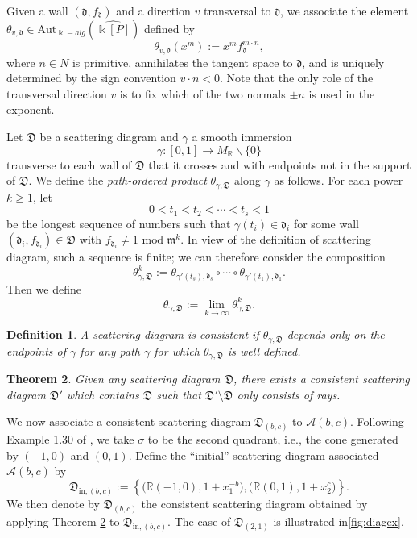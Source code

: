 \documentclass[11pt]{amsart}
\newtheorem{theorem}{Theorem}[section]
\newtheorem{defn}[theorem]{Definition}
\theoremstyle{remark}
\numberwithin{equation}{section}
\newcommand{\RR}{\mathbb{R}}
\newcommand{\cA}{\mathcal{A}}
\newcommand{\fd}{\mathfrak{d}}
\newcommand{\fD}{\mathfrak{D}}
\newcommand{\fm}{\mathfrak{m}}
\begin{document}

Given a wall $(\fd, f_{\fd})$ and a direction $v$ transversal to $\fd$, we associate the element $\theta_{v,\fd}\in
{\mathrm{Aut}}_{\Bbbk-alg}\left(\widehat{\Bbbk[P]}\right)$ defined by
\[
  \theta_{v,\fd} (x^m) := x^m f_{\fd}^{m\cdot n }, 
\]
where $n\in N$ is primitive, annihilates the tangent space to $\fd$, and is
uniquely determined by the sign convention $ v\cdot n <0$.  Note
that the only role of the transversal direction $v$ is to fix which of the two
normals $\pm n$ is used in the exponent. 

Let $\fD$ be a scattering diagram and $\gamma$ a smooth immersion
\[  
  \gamma: [0,1] \rightarrow M_{\mathbb{R}} \smallsetminus  \{0 \}  
\]
transverse to each wall of $\fD$ that it crosses and with endpoints not in the support of $\fD$. We define the \textit{path-ordered product} $\theta_{\gamma, \fD}$ along $\gamma$ as follows. For each power $k \geq 1$, let  
\[
  0< t_1 <  t_2 < \cdots < t_s < 1 
\]
be the longest sequence of numbers such that $\gamma(t_i)\in\fd_i$ for some wall
$(\fd_i,f_{\fd_i}) \in \fD$ with $f_{\fd_i} \neq 1 \text{ mod } \fm^k$.  In view of the definition of scattering diagram, such a sequence is finite; we
can therefore consider the composition 
\[
  \theta^k_{\gamma, \fD} :=
  \theta_{\gamma'(t_s),\fd_s} \circ \cdots \circ \theta_{\gamma'(t_1),\fd_1}.
\]
Then we define
\[
  \theta_{\gamma, \fD} := \lim_{k \rightarrow \infty} \theta ^k_{\gamma, \fD}. 
\]

\begin{defn}
  A scattering diagram is \emph{consistent} if $\theta _{\gamma, \fD}$ depends
  only on the endpoints of $\gamma$ for any path $\gamma$ for which
  $\theta_{\gamma, \fD}$ is well defined.
\end{defn}

\begin{theorem}\cite{KS}
  \label{th:KS}
  Given any scattering diagram $\fD$, there exists a consistent scattering
  diagram $\fD'$ which contains $\fD$ such that $\fD'\setminus\fD$ only consists
  of rays.
\end{theorem}

We now associate a consistent scattering diagram $\fD_{(b,c)}$ to 
$\cA(b,c)$.  Following Example 1.30 of \cite{GHKK}, we
take $\sigma$ to be the second quadrant, i.e., the cone generated by $(-1,0)$ and
$(0,1)$. Define the ``initial'' scattering diagram associated $\cA(b,c)$ by
\[
  \fD_{\mathrm{in},(b,c)} := 
  \left\{
    \big( \RR (-1,0), 1+x_1^{-b}\big), 
    \big( \RR (0,1), 1+x_2^c\big) 
  \right\}.
\]
We then denote by $\fD_{(b,c)}$ the consistent scattering diagram obtained by
applying Theorem \ref{th:KS} to $\fD_{\mathrm{in},(b,c)}$.  The case of $\fD_{(2,1)}$ is illustrated in\ref{fig:diagex}.
\end{document}
